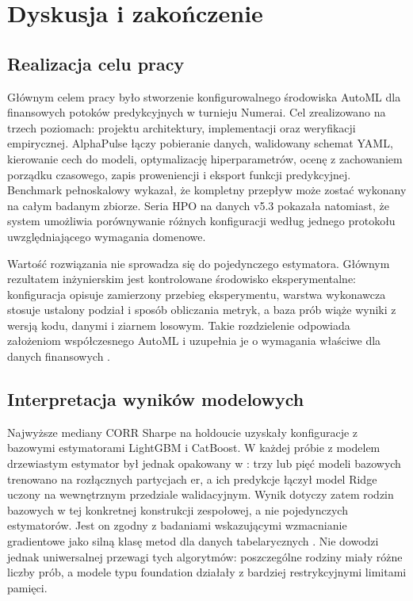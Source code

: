 \chapter{Dyskusja i zakończenie}

\section{Realizacja celu pracy}
Głównym celem pracy było stworzenie konfigurowalnego środowiska AutoML dla
finansowych potoków predykcyjnych w turnieju Numerai. Cel zrealizowano na trzech
poziomach: projektu architektury, implementacji oraz weryfikacji empirycznej.
AlphaPulse łączy pobieranie danych, walidowany schemat YAML, kierowanie cech do
modeli, optymalizację hiperparametrów, ocenę z zachowaniem porządku czasowego,
zapis proweniencji i eksport funkcji predykcyjnej. Benchmark pełnoskalowy wykazał,
że kompletny przepływ może zostać wykonany na całym badanym zbiorze. Seria HPO
na danych v5.3 pokazała natomiast, że system umożliwia porównywanie różnych
konfiguracji według jednego protokołu uwzględniającego wymagania domenowe.

Wartość rozwiązania nie sprowadza się do pojedynczego estymatora. Głównym
rezultatem inżynierskim jest kontrolowane środowisko eksperymentalne:
konfiguracja opisuje zamierzony przebieg eksperymentu, warstwa wykonawcza stosuje
ustalony podział i sposób obliczania metryk, a baza prób wiąże wyniki z wersją
kodu, danymi i ziarnem losowym. Takie rozdzielenie odpowiada założeniom
współczesnego AutoML i uzupełnia je o wymagania właściwe dla danych finansowych
.

\section{Interpretacja wyników modelowych}
Najwyższe mediany CORR Sharpe na holdoucie uzyskały konfiguracje z bazowymi
estymatorami LightGBM i CatBoost. W każdej próbie z modelem drzewiastym
estymator był jednak opakowany w : trzy lub pięć modeli
bazowych trenowano na rozłącznych partycjach er, a ich predykcje łączył model
Ridge uczony na wewnętrznym przedziale walidacyjnym. Wynik dotyczy zatem rodzin
bazowych w tej konkretnej konstrukcji zespołowej, a nie pojedynczych
estymatorów. Jest on zgodny z badaniami wskazującymi wzmacnianie gradientowe jako
silną klasę metod dla danych tabelarycznych
. Nie dowodzi jednak uniwersalnej przewagi
tych algorytmów: poszczególne rodziny miały różne liczby prób, a modele typu
foundation działały z bardziej restrykcyjnymi limitami pamięci.

